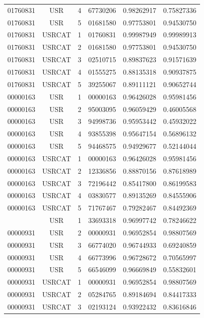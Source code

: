 \begin{longtable}{cccccc}
01760831 & USR    & 4 & 67730206 & 0.98262917 & 0.75827336\\
01760831 & USR    & 5 & 01681580 & 0.97753801 & 0.94530750\\
01760831 & USRCAT & 1 & 01760831 & 0.99987949 & 0.99989913\\%
01760831 & USRCAT & 2 & 01681580 & 0.97753801 & 0.94530750\\
01760831 & USRCAT & 3 & 02510715 & 0.89837623 & 0.91571639\\
01760831 & USRCAT & 4 & 01555275 & 0.88135318 & 0.90937875\\
01760831 & USRCAT & 5 & 39255067 & 0.89111121 & 0.90652744\\
\hline
00000163 & USR    & 1 & 00000163 & 0.96426028 & 0.95981456\\%
00000163 & USR    & 2 & 95003095 & 0.96059429 & 0.46005568\\
00000163 & USR    & 3 & 94998736 & 0.95953442 & 0.45932022\\
00000163 & USR    & 4 & 93855398 & 0.95647154 & 0.56896132\\
00000163 & USR    & 5 & 94468575 & 0.94929677 & 0.52144044\\
00000163 & USRCAT & 1 & 00000163 & 0.96426028 & 0.95981456\\%
00000163 & USRCAT & 2 & 12336856 & 0.88870156 & 0.87618989\\
00000163 & USRCAT & 3 & 72196442 & 0.85417800 & 0.86199583\\
00000163 & USRCAT & 4 & 03830577 & 0.89135269 & 0.84555906\\
00000163 & USRCAT & 5 & 71767467 & 0.79282467 & 0.84492369\\
\hline
\pagebreak
00000931 & USR    & 1 & 33693318 & 0.96997742 & 0.78246622\\%
00000931 & USR    & 2 & 00000931 & 0.96952854 & 0.98807569\\
00000931 & USR    & 3 & 66774020 & 0.96744933 & 0.69240859\\
00000931 & USR    & 4 & 66773996 & 0.96728672 & 0.70565997\\
00000931 & USR    & 5 & 66546099 & 0.96669849 & 0.55832601\\
00000931 & USRCAT & 1 & 00000931 & 0.96952854 & 0.98807569\\%
00000931 & USRCAT & 2 & 05284765 & 0.89184694 & 0.84417333\\
00000931 & USRCAT & 3 & 02193124 & 0.93922432 & 0.83616846\\

\end{longtable}
